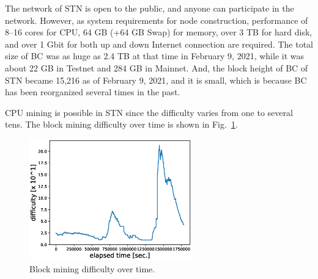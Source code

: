 \documentclass[graybox]{svmult}
\begin{document}
The network of STN is open to the public, and anyone can participate in the network. 
However, as system requirements for node construction, performance of 8--16 cores for CPU, 64 GB (+64 GB Swap) for memory, over 3 TB for hard disk, and over 1 Gbit for both up and down Internet connection are required.
The total size of BC was as huge as 2.4 TB at that time in February 9, 2021, while it was about 22 GB in Testnet and 284 GB in Mainnet. 
And, the block height of BC of STN became 15,216 as of February 9, 2021, and it is small, which is because BC has been reorganized several times in the past.

CPU mining is possible in STN since the difficulty varies from one to several tens.
The block mining difficulty over time is shown in Fig.~\ref{fig:difficulty}.
%
\begin{figure}[t]
  \vspace{-35mm}
  \begin{center}
    \includegraphics[width=70mm]{time_vs_difficulty-plot.eps}
  \end{center}
  \vspace{35mm}
  \caption{Block mining difficulty over time.}
  \label{fig:difficulty}
\end{figure}
%
\end{document}
